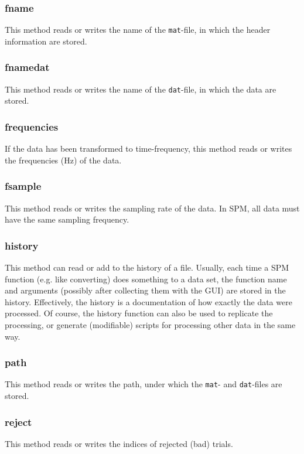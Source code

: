\subsubsection{fname}
This method reads or writes the name of the \texttt{mat}-file, in which the header information are stored.

\subsubsection{fnamedat}
This method reads or writes the name of the \texttt{dat}-file, in which the data are stored.

\subsubsection{frequencies}
If the data has been transformed to time-frequency, this method reads or writes the frequencies (Hz) of the data.

\subsubsection{fsample}
This method reads or writes the sampling rate of the data. In SPM, all data must have the same sampling frequency.

\subsubsection{history}
This method can read or add to the history of a file. Usually, each time a SPM function (e.g. like converting) does something to a data set, the function name and arguments (possibly after collecting them with the GUI) are stored in the history. Effectively, the history is a documentation of how exactly the data were processed. Of course, the history function can also be used to replicate the processing, or generate (modifiable) scripts for processing other data in the same way.

\subsubsection{path}
This method reads or writes the path, under which the \texttt{mat}- and \texttt{dat}-files are stored.

\subsubsection{reject}
This method reads or writes the indices of rejected (bad) trials.

